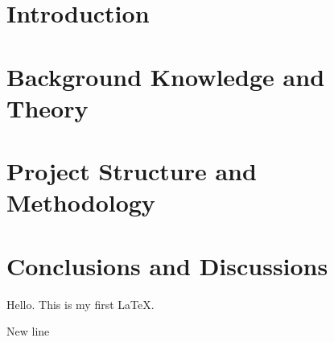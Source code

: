 \documentclass[11pt]{article}
\begin{document}
    \section{Introduction}\label{sec:introduction}
    \section{Background Knowledge and Theory}\label{sec:background}
    \section{Project Structure and Methodology}\label{sec:structure}
    \section{Conclusions and Discussions}\label{sec:conclusions}

    Hello.
    This is my first LaTeX\@.

    New line~\cite{Newin}

    
    
\end{document}
